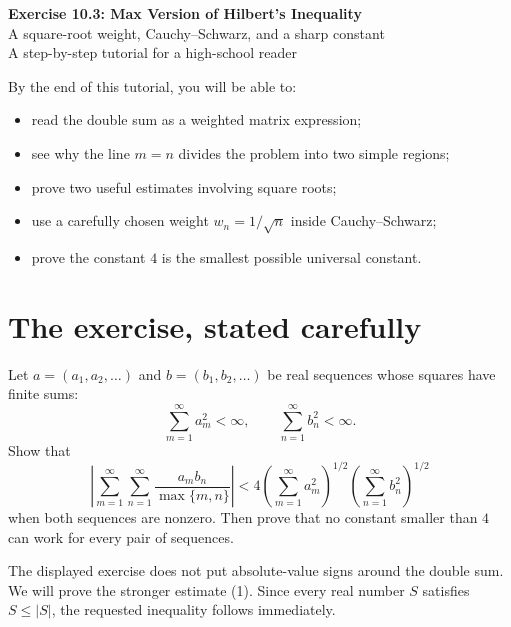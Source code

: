 \documentclass[11pt]{article}
\newcommand{\abs}[1]{\left|#1\right|}
\begin{document}
\begin{center}
  {\LARGE\bfseries Exercise 10.3: Max Version of Hilbert's Inequality}\\[0.35em]
  {\Large A square-root weight, Cauchy--Schwarz, and a sharp constant}\\[0.7em]
  {\large A step-by-step tutorial for a high-school reader}
\end{center}

\vspace{0.4em}

\begin{ideaBox}
By the end of this tutorial, you will be able to:
\begin{itemize}
  \item read the double sum as a weighted matrix expression;
  \item see why the line \(m=n\) divides the problem into two simple regions;
  \item prove two useful estimates involving square roots;
  \item use a carefully chosen weight \(w_n=1/\sqrt n\) inside Cauchy--Schwarz;
  \item prove the constant \(4\) is the smallest possible universal constant.
\end{itemize}
\end{ideaBox}

\tableofcontents
\newpage

\section{The exercise, stated carefully}

\begin{problemBox}
Let \(a=(a_1,a_2,\ldots)\) and \(b=(b_1,b_2,\ldots)\) be real sequences whose squares have finite sums:
\[
  \sum_{m=1}^{\infty}a_m^2<\infty,
  \qquad
  \sum_{n=1}^{\infty}b_n^2<\infty.
\]
Show that
\[
 \boxed{\displaystyle
 \abs{\sum_{m=1}^{\infty}\sum_{n=1}^{\infty}
       \frac{a_m b_n}{\max\{m,n\}}}
 <4
 \left(\sum_{m=1}^{\infty}a_m^2\right)^{1/2}
 \left(\sum_{n=1}^{\infty}b_n^2\right)^{1/2}}
 \tag{1}
\]
when both sequences are nonzero. Then prove that no constant smaller than \(4\) can work for every pair of sequences.
\end{problemBox}

The displayed exercise does not put absolute-value signs around the double sum. We will prove the stronger estimate (1). Since every real number \(S\) satisfies \(S\leq |S|\), the requested inequality follows immediately.
\end{document}
